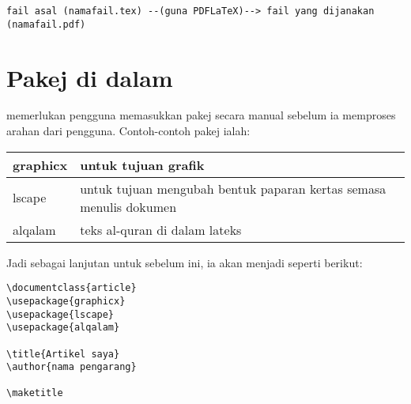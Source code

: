 \begin{Verbatim}[frame=single]
 fail asal (namafail.tex) --(guna PDFLaTeX)--> fail yang dijanakan (namafail.pdf)
\end{Verbatim}

\section{Pakej di dalam \latex{}}
\latex{} memerlukan pengguna memasukkan pakej secara manual sebelum ia memproses arahan dari pengguna. Contoh-contoh pakej ialah:\\

\begin{minipage}{\textwidth}

\begin{center}
\begin{tabular}{|l|l|}
\hline
 graphicx&  untuk tujuan grafik \\ \hline
 lscape& untuk tujuan mengubah bentuk paparan kertas semasa menulis dokumen\\ \hline
 alqalam&  teks al-quran di dalam lateks\\\hline
\end{tabular}
\end{center}   
\end{minipage}
\bigskip

Jadi sebagai lanjutan untuk sebelum ini, ia akan menjadi seperti berikut:\\

\begin{lstlisting}[frame=shadowbox]
\documentclass{article}
\usepackage{graphicx}
\usepackage{lscape}
\usepackage{alqalam}

\title{Artikel saya}
\author{nama pengarang}

\maketitle

\end{lstlisting}
